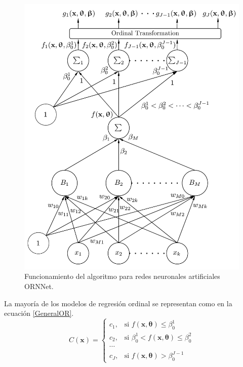 		\begin{figure}[h]
			\centering
			\includegraphics[scale=0.5]{img/ORNNet.pdf}
			\caption{Funcionamiento del algoritmo para redes neuronales artificiales ORNNet.}
			\label{fig:ORNNet}
		\end{figure}
		
		La mayoría de los modelos de regresión ordinal se representan como en la ecuación \ref{GeneralOR}.\\
		
		\begin{equation}
			C(\mathbf{x})=
			\begin{cases}
				c_1, & \text{si $f(\mathbf{x},{\boldsymbol \theta})\le \beta^1_0$}\\
				c_2, & \text{si $\beta^1_0<f(\mathbf{x},{\boldsymbol \theta})\le \beta^2_0$}\\
				\cdots\\
				c_J, & \text{si $f(\mathbf{x},{\boldsymbol \theta})>\beta^{J-1}_0$}
			\end{cases}
			\label{GeneralOR}
		\end{equation}\\


